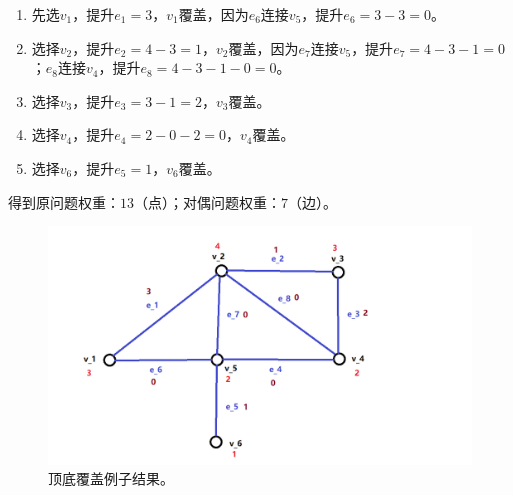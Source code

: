 \begin{enumerate}
    \item 先选$v_1$，提升$e_1 = 3$，$v_1$覆盖，因为$e_6$连接$v_5$，提升$e_6 = 3 - 3 = 0$。
    \item 选择$v_2$，提升$e_2 = 4 - 3 = 1$，$v_2$覆盖，因为$e_7$连接$v_5$，提升$e_7 = 4 - 3 - 1 = 0$；$e_8$连接$v_4$，提升$e_8 =  4 - 3 - 1 - 0 = 0$。
    \item 选择$v_3$，提升$e_3 = 3 - 1 = 2$，$v_3$覆盖。
    \item 选择$v_4$，提升$e_4 = 2 - 0 - 2 = 0$，$v_4$覆盖。
    \item 选择$v_6$，提升$e_5 = 1$，$v_6$覆盖。
\end{enumerate}
得到原问题权重：$13$（点）；对偶问题权重：$7$（边）。
\begin{figure}[H]
    \begin{center}
        \includegraphics[scale=0.4]{img/vertex_cover_result.png}
        \caption{顶底覆盖例子结果。}
    \end{center}
\end{figure}


